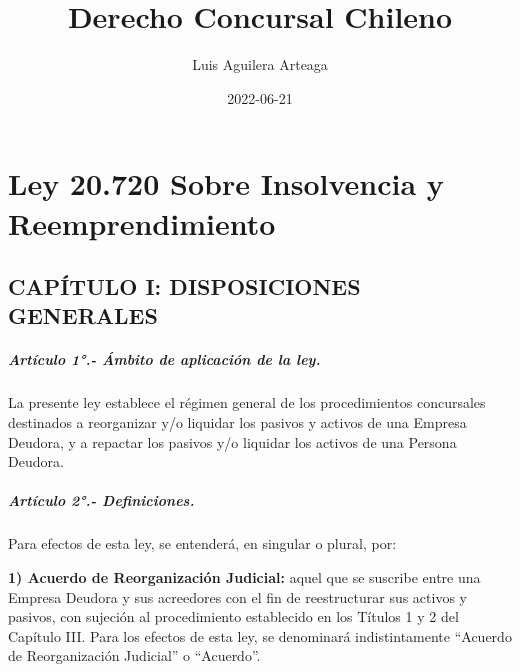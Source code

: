 \documentclass[
]{book}
\title{Derecho Concursal Chileno}
\author{Luis Aguilera Arteaga}
\date{2022-06-21}
\begin{document}
\maketitle

{
\setcounter{tocdepth}{1}
\tableofcontents
}
\hypertarget{ley-20.720-sobre-insolvencia-y-reemprendimiento}{%
\chapter*{Ley 20.720 Sobre Insolvencia y Reemprendimiento}\label{ley-20.720-sobre-insolvencia-y-reemprendimiento}}

\hypertarget{capuxedtulo-i-disposiciones-generales}{%
\section*{CAPÍTULO I: DISPOSICIONES GENERALES}\label{capuxedtulo-i-disposiciones-generales}}

\hypertarget{artuxedculo-1.--uxe1mbito-de-aplicaciuxf3n-de-la-ley.}{%
\paragraph*{Artículo 1°.- Ámbito de aplicación de la ley.}\label{artuxedculo-1.--uxe1mbito-de-aplicaciuxf3n-de-la-ley.}}

La presente ley establece el régimen general de los procedimientos concursales destinados a reorganizar y/o liquidar los pasivos y activos de una Empresa Deudora, y a repactar los pasivos y/o liquidar los activos de una Persona Deudora.

\hypertarget{artuxedculo-2.--definiciones.}{%
\paragraph*{Artículo 2°.- Definiciones.}\label{artuxedculo-2.--definiciones.}}

Para efectos de esta ley, se entenderá, en singular o plural, por:

\textbf{1) Acuerdo de Reorganización Judicial:} aquel que se suscribe entre una Empresa Deudora y sus acreedores con el fin de reestructurar sus activos y pasivos, con sujeción al procedimiento establecido en los Títulos 1 y 2 del Capítulo III. Para los efectos de esta ley, se denominará indistintamente ``Acuerdo de Reorganización Judicial'' o ``Acuerdo''.
\end{document}
